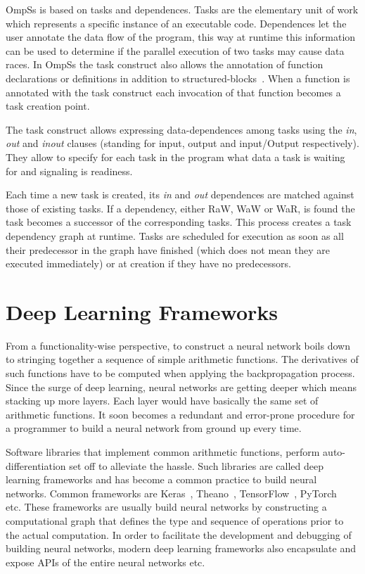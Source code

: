 OmpSs is based on tasks and dependences. Tasks are the elementary unit of work 
which represents a specific instance of an executable code. Dependences let the 
user annotate the data flow of the program, this way at runtime this information 
can be used to determine if the parallel execution of two tasks may cause data 
races. In OmpSs the task construct also allows the annotation of function 
declarations or definitions in addition to structured-blocks~\cite{Bueno13}. 
When a function is annotated with the task construct each invocation of that 
function becomes a task creation point.

The task construct allows expressing data-dependences among tasks using the 
\textit{in}, \textit{out} and \textit{inout} clauses (standing for input, output 
and input/Output respectively). They allow to specify for each task in the 
program what data a task is waiting for and signaling is readiness.

Each time a new task is created, its \textit{in} and \textit{out} dependences 
are matched against those of existing tasks. If a dependency, either RaW, WaW or 
WaR, is found the task becomes a successor of the corresponding tasks. This 
process creates a task dependency graph at runtime. Tasks are scheduled for 
execution as soon as all their predecessor in the graph have finished (which 
does not mean they are executed immediately) or at creation if they have no 
predecessors.

\section{Deep Learning Frameworks}
From a functionality-wise perspective, to construct a neural network boils down 
to stringing together a sequence of simple arithmetic functions. The derivatives
of such functions have to be computed when applying the backpropagation process.
Since the surge of deep learning, neural networks are getting deeper which means 
stacking up more layers. Each layer would have basically the same set of 
arithmetic functions. It soon becomes a redundant and error-prone procedure for 
a programmer to build a neural network from ground up every time. 

Software libraries that implement common arithmetic functions, perform 
auto-differentiation set off to alleviate the hassle. Such libraries are called 
deep learning frameworks and has become a common practice to build neural 
networks. Common frameworks are Keras~\cite{keras}, Theano~\cite{theano}, 
TensorFlow~\cite{tensorflow}, PyTorch~\cite{pytorch} etc. These frameworks are 
usually build neural networks by constructing a computational graph that defines 
the type and sequence of operations prior to the actual computation.
In order to facilitate the development and debugging of building neural 
networks,
modern deep learning frameworks also encapsulate and expose APIs of the entire 
neural networks etc.

